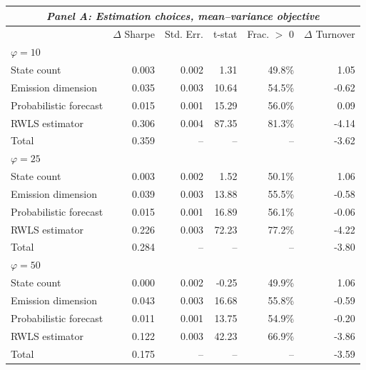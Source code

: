 \begin{tabular*}{\textwidth}{l@{\extracolsep{\fill}}rrrrr}
\toprule
\multicolumn{6}{c}{\textit{Panel A: Estimation choices, mean--variance objective}} \\
\midrule
 & $\Delta$ Sharpe & Std. Err. & t-stat & Frac. $>$ 0 & $\Delta$ Turnover \\
\midrule
\multicolumn{6}{l}{\textit{$\varphi = 10$}} \\
\midrule
State count & 0.003\phantom{$^{***}$} & 0.002 & 1.31 & 49.8\% & 1.05 \\
Emission dimension & 0.035\rlap{$^{***}$}\phantom{$^{***}$} & 0.003 & 10.64 & 54.5\% & -0.62 \\
Probabilistic forecast & 0.015\rlap{$^{***}$}\phantom{$^{***}$} & 0.001 & 15.29 & 56.0\% & 0.09 \\
RWLS estimator & 0.306\rlap{$^{***}$}\phantom{$^{***}$} & 0.004 & 87.35 & 81.3\% & -4.14 \\
Total & 0.359\phantom{$^{***}$} & -- & -- & -- & -3.62 \\
\midrule
\multicolumn{6}{l}{\textit{$\varphi = 25$}} \\
\midrule
State count & 0.003\phantom{$^{***}$} & 0.002 & 1.52 & 50.1\% & 1.06 \\
Emission dimension & 0.039\rlap{$^{***}$}\phantom{$^{***}$} & 0.003 & 13.88 & 55.5\% & -0.58 \\
Probabilistic forecast & 0.015\rlap{$^{***}$}\phantom{$^{***}$} & 0.001 & 16.89 & 56.1\% & -0.06 \\
RWLS estimator & 0.226\rlap{$^{***}$}\phantom{$^{***}$} & 0.003 & 72.23 & 77.2\% & -4.22 \\
Total & 0.284\phantom{$^{***}$} & -- & -- & -- & -3.80 \\
\midrule
\multicolumn{6}{l}{\textit{$\varphi = 50$}} \\
\midrule
State count & 0.000\phantom{$^{***}$} & 0.002 & -0.25 & 49.9\% & 1.06 \\
Emission dimension & 0.043\rlap{$^{***}$}\phantom{$^{***}$} & 0.003 & 16.68 & 55.8\% & -0.59 \\
Probabilistic forecast & 0.011\rlap{$^{***}$}\phantom{$^{***}$} & 0.001 & 13.75 & 54.9\% & -0.20 \\
RWLS estimator & 0.122\rlap{$^{***}$}\phantom{$^{***}$} & 0.003 & 42.23 & 66.9\% & -3.86 \\
Total & 0.175\phantom{$^{***}$} & -- & -- & -- & -3.59 \\
\midrule[\heavyrulewidth]
\end{tabular*}

